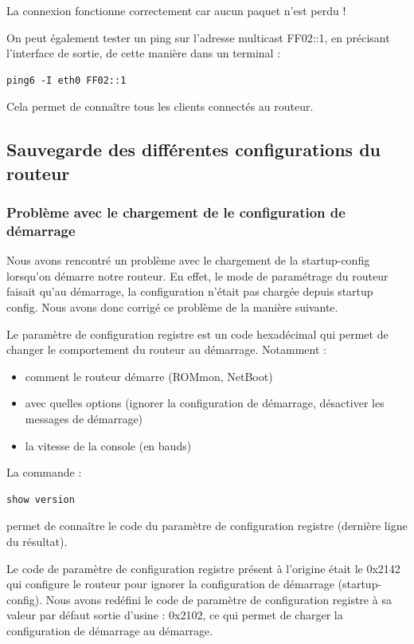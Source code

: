     La connexion fonctionne correctement car aucun paquet n'est perdu !
    
    On peut également tester un ping sur l'adresse multicast FF02::1, en précisant l'interface de sortie, de cette manière dans un terminal :
    	\begin{lstlisting}[frame=single]
ping6 -I eth0 FF02::1
        \end{lstlisting}
     Cela permet de connaître tous les clients connectés au routeur.
    
	\subsection{Sauvegarde des différentes configurations du routeur}
    
    \subsubsection{Problème avec le chargement de le configuration de démarrage}
    
    	Nous avons rencontré un problème avec le chargement de la startup-config lorsqu'on démarre notre routeur. En effet, le mode de paramétrage du routeur faisait qu'au démarrage, la configuration n'était pas chargée depuis startup config. Nous avons donc corrigé ce problème de la manière suivante. 
    
Le paramètre de configuration registre est un code hexadécimal qui permet de changer le comportement du routeur au démarrage.\cite{config-register} Notamment : 
\begin{itemize}
\item comment le routeur démarre (ROMmon, NetBoot)
\item avec quelles options (ignorer la configuration de démarrage, désactiver les messages de démarrage)
\item la vitesse de la console (en bauds)
\end{itemize}
        
La commande :         
		\begin{lstlisting}[frame=single]
          show version
        \end{lstlisting}
permet de connaître le code du paramètre de configuration registre (dernière ligne du résultat).

Le code de paramètre de configuration registre présent à l'origine était le 0x2142 qui configure le routeur pour ignorer la configuration de démarrage (startup-config). 
Nous avons redéfini le code de paramètre de configuration registre à sa valeur par défaut sortie d'usine : 0x2102, ce qui permet de charger la configuration de démarrage au démarrage.
        
